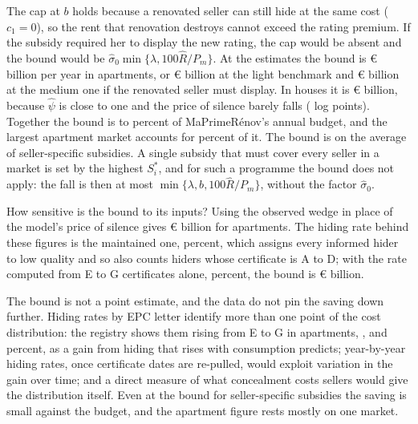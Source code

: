 \documentclass[10pt,letterpaper]{bp-template-concise}
\begin{document}
The cap at $b$ holds because a renovated seller can still hide at the same cost ($c_1=0$), so the rent that renovation destroys cannot exceed the rating premium. If the subsidy required her to display the new rating, the cap would be absent and the bound would be $\hat\sigma_0\min\{\lambda,100\hat R/P_m\}$. At the estimates the bound is \euro{}\attSavingUbTwoFiftyApt{} billion per year in apartments, or \euro{}\attSavingUbDTwoFiftyApt{} billion at the light benchmark and \euro{}\attSavingUbDFiveHundredApt{} billion at the medium one if the renovated seller must display. In houses it is \euro{}\attSavingUbTwoFiftyHouse{} billion, because $\hat\psi$ is close to one and the price of silence barely falls (\attSalienceHouse{} log points). Together the bound is \attSavingUbTotTwoFiftyLo{} to \attSavingUbTotTwoFiftyHi{} percent of MaPrimeR\'enov's annual budget, and the largest apartment market accounts for \attSavingTopShareApt{} percent of it. The bound is on the average of seller-specific subsidies. A single subsidy that must cover every seller in a market is set by the highest $S_i^*$, and for such a programme the bound does not apply: the fall is then at most $\min\{\lambda,b,100\hat R/P_m\}$, without the factor $\hat\sigma_0$.

How sensitive is the bound to its inputs? Using the observed wedge in place of the model's price of silence gives \euro{}\attSavingUbObsTwoFiftyApt{} billion for apartments. The hiding rate behind these figures is the maintained one, \attSigmaObsApt{} percent, which assigns every informed hider to low quality and so also counts hiders whose certificate is A to D; with the rate computed from E to G certificates alone, \attSigmaRegMeanApt{} percent, the bound is \euro{}\attSavingUbRegTwoFiftyApt{} billion.

The bound is not a point estimate, and the data do not pin the saving down further. Hiding rates by EPC letter identify more than one point of the cost distribution: the registry shows them rising from E to G in apartments, \attHideLetterEApt{}, \attHideLetterFApt{} and \attHideLetterGApt{} percent, as a gain from hiding that rises with consumption predicts; year-by-year hiding rates, once certificate dates are re-pulled, would exploit variation in the gain over time; and a direct measure of what concealment costs sellers would give the distribution itself. Even at the bound for seller-specific subsidies the saving is small against the budget, and the apartment figure rests mostly on one market.

\end{document}
